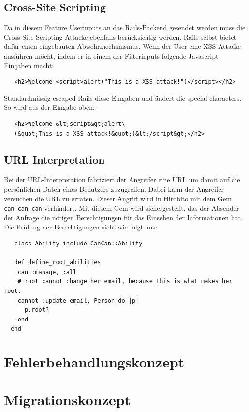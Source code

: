 \subsection{Cross-Site Scripting}
Da in diesem Feature Userinputs an das Rails-Backend gesendet werden muss die Cross-Site Scripting Attacke ebenfalls
berücksichtig werden. Rails selbst bietet dafür einen eingebauten Abwehrmechanismus. Wenn der User eine XSS-Attacke ausführen möcht,
indem er in einem der Filterinputs folgende Javascript Eingaben macht:

\begin{verbatim}
   <h2>Welcome <script>alert("This is a XSS attack!")</script></h2>
\end{verbatim}

Standardmässig escaped Rails diese Eingaben und ändert die special characters. So wird aus der Eingabe oben:

\begin{verbatim}
   <h2>Welcome &lt;script&gt;alert\
   (&quot;This is a XSS attack!&quot;)&lt;/script&gt;</h2>
\end{verbatim}

\newpage

\subsection{URL Interpretation}
Bei der URL-Interpretation fabriziert der Angreifer eine URL um damit auf die persönlichen
Daten eines Benutzers zuzugreifen. Dabei kann der Angreifer versuchen die URL zu erraten. 
Dieser Angriff wird in Hitobito mit dem Gem \texttt{can-can-can} verhindert. Mit diesem Gem wird sichergestellt,
das der Absender der Anfrage die nötigen Berechtigungen für das Einsehen der Informationen hat. Die Prüfung der Berechtigungen sieht wie folgt
aus: 

\begin{verbatim}
   class Ability include CanCan::Ability

   def define_root_abilities
    can :manage, :all
    # root cannot change her email, because this is what makes her root.
    cannot :update_email, Person do |p|
      p.root?
    end
  end
\end{verbatim}


\section{Fehlerbehandlungskonzept}
\section{Migrationskonzept}
